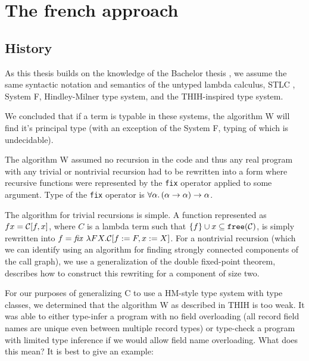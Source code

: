 \providecommand{\free}[1]{\mtt{free} (#1)}
\providecommand{\dom}[1]{\mtt{Dom} (#1)}
\providecommand{\ran}[1]{\mtt{Ran} (#1)}

\providecommand{\bmath}[1]{\boldmath{#1}}

\chapter{The french approach}


\section{History }

As this thesis builds on the knowledge of the Bachelor thesis , we assume the same syntactic notation and semantics of the untyped lambda calculus, STLC , System F, Hindley-Milner type system, and the THIH-inspired type system.

We concluded that if a term is typable in these systems, the algorithm W will find it's principal type (with an exception of the System F, typing of which is undecidable).

The algorithm W assumed no recursion in the code and thus any real program with any trivial or nontrivial recursion had to be rewritten into a form where recursive functions were represented by the \lstinline{fix} operator applied to some argument. Type of the \lstinline{fix} operator is $\forall \alpha . \left(\alpha \to \alpha\right) \to \alpha$.

The algorithm for trivial recursions is simple. A function represented as $f \boldmath{x} = \mathcal{C}[f, \boldmath{x}]$, where $C$ is a lambda term such that $\{f\} \cup \boldmath{x} \subseteq \free \calC$, is simply rewritten into $f = \mathit{fix}\ \lambda F \boldmath{X} .\mathcal{C}[f := F, \boldmath{x} := \boldmath{X}]$. For a nontrivial recursion (which we can identify using an algorithm for finding strongly connected components of the call graph), we use a generalization of the double fixed-point  theorem, describes how to construct this rewriting for a component of size two.

For our purposes of generalizing C to use a HM-style type system with type classes, we determined that the algorithm W as described in THIH is too weak. It was able to either type-infer a program with no field overloading (all record field names are unique even between multiple record types) or type-check a program with limited type inference if we would allow field name overloading. What does this mean? It is best to give an example:


